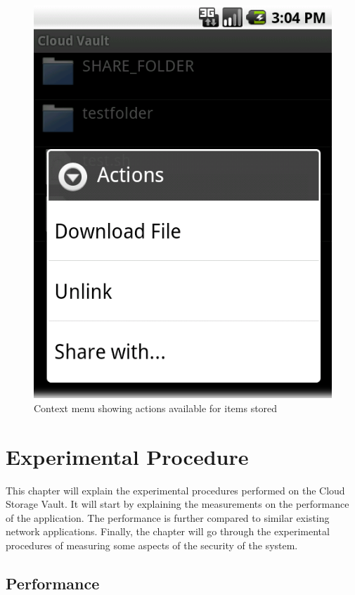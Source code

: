 \documentclass[pdftex,english,10pt,b5paper,twoside]{book}
\begin{document}
\begin{figure}[h!]
    \centering
    \includegraphics[scale=0.4]{client-browsecontext.png}
    \caption{Context menu showing actions available for items stored}
    \label{fig:CSVAndroid:remotecontext}
\end{figure}

\chapter{Experimental Procedure}
\label{ch:experimental}

This chapter will explain the experimental procedures performed on the Cloud
Storage Vault. It will start by explaining the measurements on the performance
of the application. The performance is further compared to similar existing
network applications. Finally, the chapter will go through the experimental
procedures of measuring some aspects of the security of the system.

\section{Performance}
\end{document}
